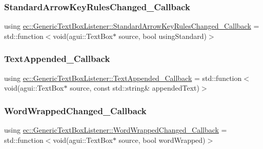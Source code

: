 \subsubsection{\texorpdfstring{Standard\+Arrow\+Key\+Rules\+Changed\+\_\+\+Callback}{StandardArrowKeyRulesChanged\_Callback}}
{\footnotesize\ttfamily using \mbox{\hyperlink{classec_1_1_generic_text_box_listener_a1099a678278dd6c888d0ba18af73979b}{ec\+::\+Generic\+Text\+Box\+Listener\+::\+Standard\+Arrow\+Key\+Rules\+Changed\+\_\+\+Callback}} =  std\+::function$<$void(agui\+::\+Text\+Box$\ast$ source, bool using\+Standard)$>$}

\mbox{\label{classec_1_1_generic_text_box_listener_a7bc50ee05522edf211ca7ce6a86f16c7}} 
\subsubsection{\texorpdfstring{Text\+Appended\+\_\+\+Callback}{TextAppended\_Callback}}
{\footnotesize\ttfamily using \mbox{\hyperlink{classec_1_1_generic_text_box_listener_a7bc50ee05522edf211ca7ce6a86f16c7}{ec\+::\+Generic\+Text\+Box\+Listener\+::\+Text\+Appended\+\_\+\+Callback}} =  std\+::function$<$void(agui\+::\+Text\+Box$\ast$ source, const std\+::string\& appended\+Text)$>$}

\mbox{\label{classec_1_1_generic_text_box_listener_aa94d95c932df4d70fe03c501520f0d16}} 
\subsubsection{\texorpdfstring{Word\+Wrapped\+Changed\+\_\+\+Callback}{WordWrappedChanged\_Callback}}
{\footnotesize\ttfamily using \mbox{\hyperlink{classec_1_1_generic_text_box_listener_aa94d95c932df4d70fe03c501520f0d16}{ec\+::\+Generic\+Text\+Box\+Listener\+::\+Word\+Wrapped\+Changed\+\_\+\+Callback}} =  std\+::function$<$void(agui\+::\+Text\+Box$\ast$ source, bool word\+Wrapped)$>$}




